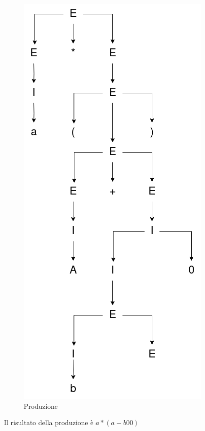 \documentclass[12pt]{article}
\begin{document}
\begin{figure}[ht]
	\includegraphics[scale = 0.3]{media/prod_concat.png}
	\centering
	\caption{Produzione}
  \label{prod}
\end{figure}
\newpage
Il risultato della produzione è $a*(a+b00)$
\end{document}
